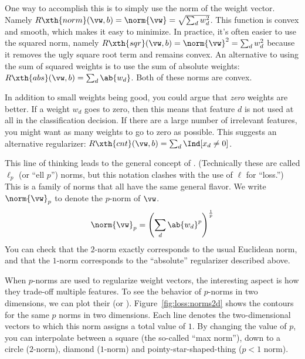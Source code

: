 One way to accomplish this is to simply use the norm of the weight
vector.  Namely $R\xth{norm}(\vw,b) = \norm{\vw} = \sqrt{\sum_d
  w_d^2}$.  This function is convex and smooth, which makes it easy to
minimize.  In practice, it's often easier to use the squared norm,
namely $R\xth{sqr}(\vw,b) = \norm{\vw}^2 = \sum_d w_d^2$ because it
removes the ugly square root term and remains convex.  An alternative
to using the sum of squared weights is to use the sum of absolute
weights: $R\xth{abs}(\vw,b) = \sum_d \ab{w_d}$.  Both of these norms
are convex.


In addition to small weights being good, you could argue that
\emph{zero} weights are better.  If a weight $w_d$ goes to zero, then
this means that feature $d$ is not used at all in the classification
decision.  If there are a large number of irrelevant features, you
might want as many weights to go to zero as possible.  This suggests
an alternative regularizer: $R\xth{cnt}(\vw,b) = \sum_d \Ind[x_d \neq
0]$.


This line of thinking leads to the general concept of
.  (Technically these are called $\ell_p$ (or ``ell
$p$'') norms, but this notation clashes with the use of $\ell$ for
``loss.'')  This is a family of norms that all have the same general
flavor.  We write $\norm{\vw}_p$ to denote the $p$-norm of $\vw$.
%
\begin{equation} \label{eq:loss:l}
  \norm{\vw}_p = \left( \sum_d \ab{w_d}^p \right)^{\frac 1 p}
\end{equation}
%
You can check that the $2$-norm exactly corresponds to the usual
Euclidean norm, and that the $1$-norm corresponds to the ``absolute''
regularizer described above.



When $p$-norms are used to regularize weight vectors, the interesting
aspect is how they trade-off multiple features.  To see the behavior
of $p$-norms in two dimensions, we can plot their 
(or ).  Figure~\ref{fig:loss:norms2d} shows the
contours for the same $p$ norms in two dimensions.  Each line denotes
the two-dimensional vectors to which this norm assigns a total value
of $1$.  By changing the value of $p$, you can interpolate between a
square (the so-called ``max norm''), down to a circle ($2$-norm),
diamond ($1$-norm) and pointy-star-shaped-thing ($p<1$ norm).

